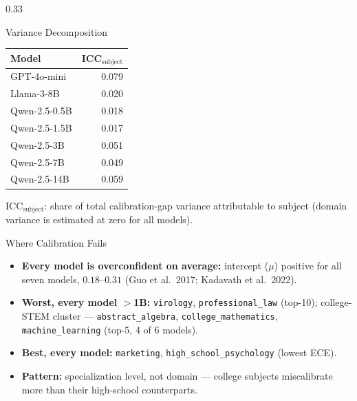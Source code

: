 \documentclass[final]{beamer}
\begin{document}
\begin{frame}[t]
\begin{columns}[t]
\begin{column}{0.33\linewidth}
\begin{block}{Variance Decomposition}
      \vspace{0.5em}
      \begin{center}
      \small
      \begin{tabular}{lr}
        \toprule
        Model & ICC$_{\text{subject}}$ \\
        \midrule
        GPT-4o-mini            & 0.079 \\
        Llama-3-8B             & 0.020 \\
        Qwen-2.5-0.5B          & 0.018 \\
        Qwen-2.5-1.5B          & 0.017 \\
        Qwen-2.5-3B            & 0.051 \\
        Qwen-2.5-7B            & 0.049 \\
        Qwen-2.5-14B           & 0.059 \\
        \bottomrule
      \end{tabular}
      \end{center}
      {\small ICC$_{\text{subject}}$: share of total calibration-gap variance
      attributable to subject (domain variance is estimated at zero for all
      models).}
    \end{block}

    \begin{block}{Where Calibration Fails}
      \begin{itemize}
        \item \textbf{Every model is overconfident on average:} intercept
          ($\mu$) positive for all seven models, $0.18$--$0.31$ (Guo et al.\
          2017; Kadavath et al.\ 2022).
        \vspace{0.3em}
        \item \textbf{Worst, every model $>$1B:} \texttt{virology},
          \texttt{professional\_law} (top-10); college-STEM cluster ---
          \texttt{abstract\_algebra}, \texttt{college\_mathematics},
          \texttt{machine\_learning} (top-5, 4 of 6 models).
        \item \textbf{Best, every model:} \texttt{marketing},
          \texttt{high\_school\_psychology} (lowest ECE).
        \item \textbf{Pattern:} specialization level, not domain ---
          college subjects miscalibrate more than their high-school
          counterparts.
      \end{itemize}


\end{block}
\end{column}
\end{columns}
\end{frame}
\end{document}
